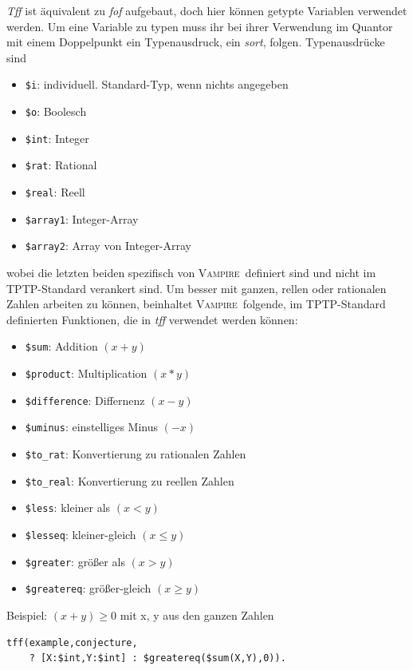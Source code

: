 \documentclass{article}
\newcommand{\vampire}{\textsc{Vampire}~}
\begin{document}
\textit{Tff} ist äquivalent zu \textit{fof} aufgebaut, doch hier können getypte Variablen verwendet werden. Um eine Variable zu typen muss ihr bei ihrer Verwendung im Quantor mit einem Doppelpunkt ein Typenausdruck, ein \textit{sort}, folgen.
Typenausdrücke sind \begin{itemize}
	\item \verb=$i=: individuell. Standard-Typ, wenn nichts angegeben
	\item \verb=$o=: Boolesch
	\item \verb=$int=: Integer
	\item \verb=$rat=: Rational
	\item \verb=$real=: Reell
	\item \verb=$array1=: Integer-Array
	\item \verb=$array2=: Array von Integer-Array
\end{itemize}
wobei die letzten beiden spezifisch von \vampire definiert sind und nicht im TPTP-Standard verankert sind.
Um besser mit ganzen, rellen oder rationalen Zahlen arbeiten zu können, beinhaltet \vampire folgende, im TPTP-Standard definierten Funktionen, die in \textit{tff} verwendet werden können:
\begin{itemize}
	\item \verb=$sum=: Addition $(x + y)$
	\item \verb=$product=: Multiplication $(x * y)$
	\item \verb=$difference=: Differnenz $(x - y)$
	\item \verb=$uminus=: einstelliges Minus $(-x)$
	\item \verb=$to_rat=: Konvertierung zu rationalen Zahlen
	\item \verb=$to_real=: Konvertierung zu reellen Zahlen
	\item \verb=$less=: kleiner als $(x < y)$
	\item \verb=$lesseq=: kleiner-gleich $(x \leq y)$
	\item \verb=$greater=: größer als $(x > y)$
	\item \verb=$greatereq=: größer-gleich $(x \geq y)$ 
\end{itemize}
Beispiel: $(x + y) \geq 0$ mit x, y aus den ganzen Zahlen
\begin{lstlisting}[language=tptp]
tff(example,conjecture, 
	? [X:$int,Y:$int] : $greatereq($sum(X,Y),0)).\end{lstlisting} \cite[S.24-25]{cav2013}
	
\end{document}
